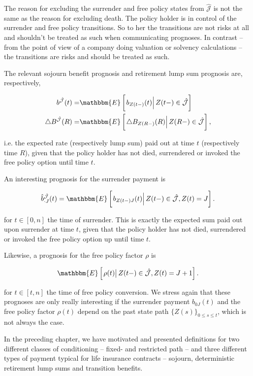 \documentclass{article}
\newcommand{\1}[1]{\mathbbm{1}_{\left\lbrace #1 \right\rbrace}}
\newcommand{\econd}[2][def]{\mathbbm{E} \left[ \left. #1 \right| #2 \right]}
\theoremstyle{break}
\theoremstyle{remark}
\numberwithin{equation}{section}
\begin{document}
The reason for excluding the surrender and free policy states from $\hat{\mathcal{J}}$ is not the same as the reason for excluding death. The policy holder is in control of the surrender and free policy transitions. So to her the transitions are not risks at all and shouldn't be treated as such when communicating prognoses. In contrast -- from the point of view of a company doing valuation or solvency calculations -- the transitions are risks and should be treated as such.

The relevant sojourn benefit prognosis and retirement lump sum prognosis are, respectively, 

\begin{align*}
b^{\hat{\mathcal{J}}}(t) =& \econd[b_{Z(t-)}(t)]{Z(t-) \in \hat{\mathcal{J}}} \\
\triangle B^{\hat{\mathcal{J}}}(R) =& \econd[\triangle B_{Z(R-)}(R)]{Z(R-) \in \hat{\mathcal{J}}},
\end{align*}

i.e. the expected rate (respectively lump sum) paid out at time $t$ (respectively time $R$), given that the policy holder has not died, surrendered or invoked the free policy option until time $t$.

An interesting prognosis for the surrender payment is

\begin{align*}
\hat{b}_{\cdot J}^{\hat{\mathcal{J}}}(t) = \econd[b_{Z(t-)J}(t)]{Z(t-) \in \hat{\mathcal{J}}, Z(t)=J}.
\end{align*}

for $t \in [0,n]$ the time of surrender. This is exactly the expected sum paid out upon surrender at time $t$, given that the policy holder has not died, surrendered or invoked the free policy option up until time $t$.

Likewise, a prognosis for the free policy factor $\rho$ is

\begin{align*}
\econd[\rho(t)]{Z(t-) \in \hat{\mathcal{J}}, Z(t)=J+1}.
\end{align*}

for $t \in [t,n]$ the time of free policy conversion. We stress again that these prognoses are only really interesting if the surrender payment $b_{0J}(t)$ and the free policy factor $\rho(t)$ depend on the past state path $\{ Z(s) \}_{0 \leq s \leq t}$, which is not always the case.

\bigbreak
\bigbreak
\bigbreak

In the preceding chapter, we have motivated and presented definitions for two different classes of conditioning -- fixed- and restricted path -- and three different types of payment typical for life insurance contracts -- sojourn, deterministic retirement lump sums and transition benefits.
\end{document}
